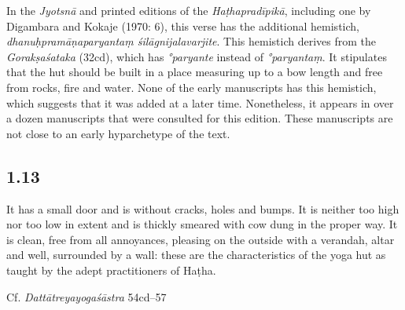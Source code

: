 \begin{ekdosis}
\begin{philcomm}[hp01_012]
In the \emph{Jyotsnā} and printed editions of the \emph{Haṭhapradīpikā}, including one by Digambara and Kokaje (1970: 6), this verse has the additional hemistich, \emph{dhanuḥpramāṇaparyantaṃ śilāgnijalavarjite}. This hemistich derives from the \emph{Gorakṣaśataka} (32cd), which has \emph{°paryante} instead of \emph{°paryantaṃ}. It stipulates that the hut should be built in a place measuring up to a bow length and free from rocks, fire and water. None of the early manuscripts has this hemistich, which suggests that it was added at a later time. Nonetheless, it appears in over a dozen manuscripts that were consulted for this edition. These manuscripts are not close to an early hyp\-archetype of the text.
\end{philcomm}

\subsection*{1.13}
\begin{translation}[hp01_013]
It has a small door and is without cracks, holes and bumps. It is neither too high nor too low in extent and is thickly smeared with cow dung in the proper way. It is clean, free from all annoyances, pleasing on the outside with a verandah, altar and well, surrounded by a wall: these are the characteristics of the yoga hut as taught by the adept practitioners of Haṭha.
\end{translation}

\begin{sources}[hp01_013]
Cf. \emph{Dattātreyayogaśāstra} 54cd–57

\begin{versinnote}
\end{versinnote}

\end{sources}


\end{ekdosis}
